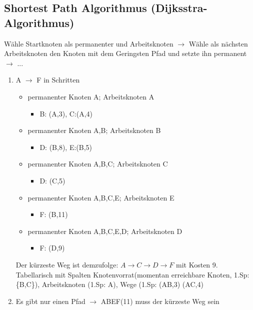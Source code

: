 \subsection{Shortest Path Algorithmus (Dijksstra-Algorithmus)}
Wähle Startknoten als permanenter und Arbeitsknoten $\to$ Wähle als nächsten Arbeitsknoten den Knoten mit dem Geringsten Pfad und setzte ihn permanent $\to$ ...
\begin{enumerate}
	\item A $\to$ F in Schritten
	\begin{itemize}
		\item permanenter Knoten A; Arbeitsknoten A
		\begin{itemize}
			\item B: (A,3), C:(A,4)
		\end{itemize}		 
		\item permanenter Knoten A,B; Arbeitsknoten B
		\begin{itemize}
			\item D: (B,8), E:(B,5)
		\end{itemize}
		\item permanenter Knoten A,B,C; Arbeitsknoten C
		\begin{itemize}
			\item D: (C,5)
		\end{itemize}
		\item permanenter Knoten A,B,C,E; Arbeitsknoten E
		\begin{itemize}
			\item F: (B,11)
		\end{itemize}
		\item permanenter Knoten A,B,C,E,D; Arbeitsknoten D
		\begin{itemize}
			\item F: (D,9)
		\end{itemize}
	\end{itemize}
	Der kürzeste Weg ist demzufolge: $A\to C\to D\to F$ mit Kosten 9. 				Tabellarisch mit Spalten Knotenvorrat(momentan erreichbare Knoten, 1.Sp: 		\{B,C\}), Arbeitsknoten (1.Sp: A), Wege (1.Sp: (AB,3) (AC,4)
	\item Es gibt nur einen Pfad $\to$ ABEF(11) muss der kürzeste Weg sein
\end{enumerate}
